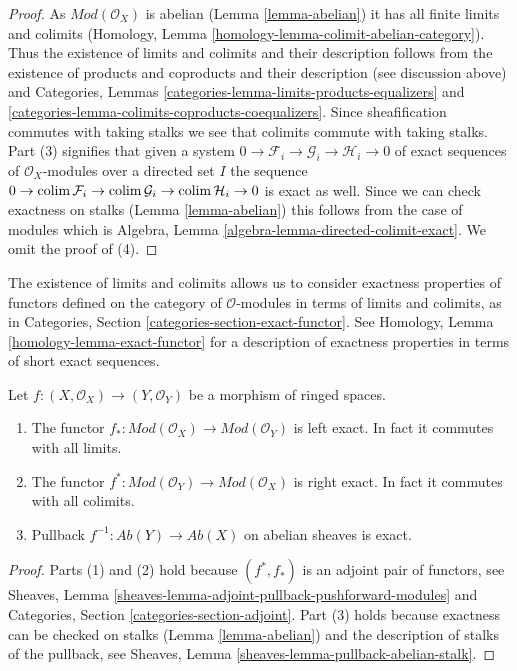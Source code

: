 \begin{proof}
As $\textit{Mod}(\mathcal{O}_X)$ is abelian (Lemma \ref{lemma-abelian})
it has all finite limits and colimits
(Homology, Lemma \ref{homology-lemma-colimit-abelian-category}).
Thus the existence of limits and colimits and their description follows from
the existence of products and coproducts and their description
(see discussion above) and
Categories, Lemmas \ref{categories-lemma-limits-products-equalizers} and
\ref{categories-lemma-colimits-coproducts-coequalizers}.
Since sheafification commutes with taking stalks we see that
colimits commute with taking stalks. Part (3) signifies that given
a system $0 \to \mathcal{F}_i \to \mathcal{G}_i \to \mathcal{H}_i \to 0$
of exact sequences of $\mathcal{O}_X$-modules over a directed set $I$
the sequence $0 \to \mathop{\mathrm{colim}}\nolimits \mathcal{F}_i \to \mathop{\mathrm{colim}}\nolimits \mathcal{G}_i \to
\mathop{\mathrm{colim}}\nolimits \mathcal{H}_i \to 0$ is exact as well. Since we can check
exactness on stalks (Lemma \ref{lemma-abelian}) this follows from the case
of modules which is
Algebra, Lemma \ref{algebra-lemma-directed-colimit-exact}.
We omit the proof of (4).
\end{proof}

\noindent
The existence of limits and colimits
allows us to consider exactness properties of
functors defined on the category of $\mathcal{O}$-modules
in terms of limits and colimits, as in
Categories, Section \ref{categories-section-exact-functor}.
See Homology, Lemma \ref{homology-lemma-exact-functor} for a
description of exactness
properties in terms of short exact sequences.

\begin{lemma}
\label{lemma-exactness-pushforward-pullback}
Let $f : (X, \mathcal{O}_X) \to (Y, \mathcal{O}_Y)$
be a morphism of ringed spaces.
\begin{enumerate}
\item The functor
$f_* : \textit{Mod}(\mathcal{O}_X) \to \textit{Mod}(\mathcal{O}_Y)$
is left exact. In fact it commutes with all limits.
\item The functor
$f^* : \textit{Mod}(\mathcal{O}_Y) \to \textit{Mod}(\mathcal{O}_X)$
is right exact. In fact it commutes with all colimits.
\item Pullback $f^{-1} : \textit{Ab}(Y) \to \textit{Ab}(X)$
on abelian sheaves is exact.
\end{enumerate}
\end{lemma}

\begin{proof}
Parts (1) and (2) hold because $(f^*, f_*)$ is an adjoint pair
of functors, see
Sheaves, Lemma \ref{sheaves-lemma-adjoint-pullback-pushforward-modules}
and
Categories, Section \ref{categories-section-adjoint}.
Part (3) holds because exactness can be checked on stalks
(Lemma \ref{lemma-abelian})
and the description of stalks of the pullback, see
Sheaves, Lemma \ref{sheaves-lemma-pullback-abelian-stalk}.
\end{proof}


